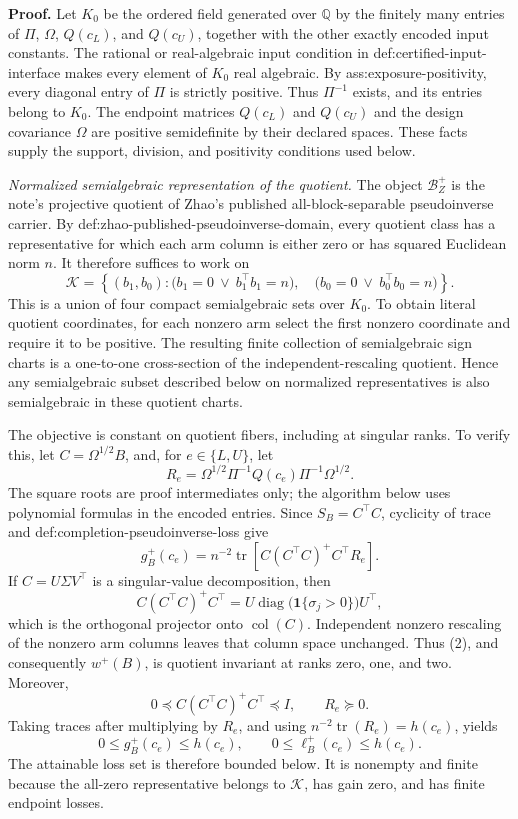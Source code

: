 \textbf{Proof.}
Let \(K_0\) be the ordered field generated over \(\mathbb Q\) by the finitely many entries of \(\Pi\), \(\Omega\), \(Q(c_L)\), and \(Q(c_U)\), together with the other exactly encoded input constants.  The rational or real-algebraic input condition in def:certified-input-interface makes every element of \(K_0\) real algebraic.  By ass:exposure-positivity, every diagonal entry of \(\Pi\) is strictly positive.  Thus \(\Pi^{-1}\) exists, and its entries belong to \(K_0\).  The endpoint matrices \(Q(c_L)\) and \(Q(c_U)\) and the design covariance \(\Omega\) are positive semidefinite by their declared spaces.  These facts supply the support, division, and positivity conditions used below.

\emph{Normalized semialgebraic representation of the quotient.}
The object \(\mathcal B_Z^+\) is the note's projective quotient of Zhao's published all-block-separable pseudoinverse carrier.  By def:zhao-published-pseudoinverse-domain, every quotient class has a representative for which each arm column is either zero or has squared Euclidean norm \(n\).  It therefore suffices to work on
\[
 \mathcal K
 =\left\{(b_1,b_0):
   \bigl(b_1=0\ \vee\ b_1^{\top}b_1=n\bigr),\quad
   \bigl(b_0=0\ \vee\ b_0^{\top}b_0=n\bigr)
  \right\}.
\tag{1}
\]
This is a union of four compact semialgebraic sets over \(K_0\).  To obtain literal quotient coordinates, for each nonzero arm select the first nonzero coordinate and require it to be positive.  The resulting finite collection of semialgebraic sign charts is a one-to-one cross-section of the independent-rescaling quotient.  Hence any semialgebraic subset described below on normalized representatives is also semialgebraic in these quotient charts.

The objective is constant on quotient fibers, including at singular ranks.  To verify this, let \(C=\Omega^{1/2}B\), and, for \(e\in\{L,U\}\), let
\[
 R_e=\Omega^{1/2}\Pi^{-1}Q(c_e)\Pi^{-1}\Omega^{1/2}.
\]
The square roots are proof intermediates only; the algorithm below uses polynomial formulas in the encoded entries.  Since \(S_B=C^{\top}C\), cyclicity of trace and def:completion-pseudoinverse-loss give
\[
 g_B^+(c_e)
 =n^{-2}\operatorname{tr}\!\left[
 C(C^{\top}C)^+C^{\top}R_e
 \right].
\tag{2}
\]
If \(C=U\Sigma V^{\top}\) is a singular-value decomposition, then
\[
 C(C^{\top}C)^+C^{\top}
 =U\operatorname{diag}\!\bigl(\mathbf 1\{\sigma_j>0\}\bigr)U^{\top},
\]
which is the orthogonal projector onto \(\operatorname{col}(C)\).  Independent nonzero rescaling of the nonzero arm columns leaves that column space unchanged.  Thus (2), and consequently \(w^+(B)\), is quotient invariant at ranks zero, one, and two.  Moreover,
\[
 0\preceq C(C^{\top}C)^+C^{\top}\preceq I,
 \qquad R_e\succeq0.
\]
Taking traces after multiplying by \(R_e\), and using \(n^{-2}\operatorname{tr}(R_e)=h(c_e)\), yields
\[
 0\le g_B^+(c_e)\le h(c_e),
 \qquad
 0\le \ell_B^+(c_e)\le h(c_e).
\tag{3}
\]
The attainable loss set is therefore bounded below.  It is nonempty and finite because the all-zero representative belongs to \(\mathcal K\), has gain zero, and has finite endpoint losses.

